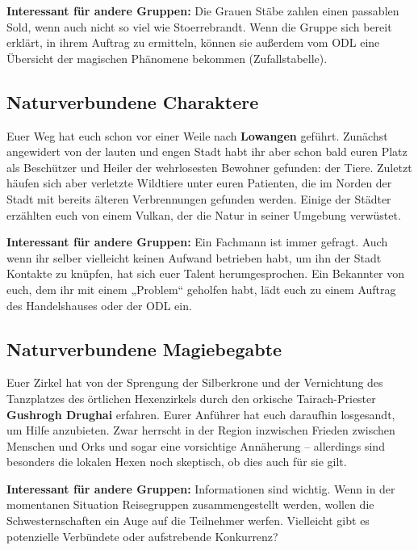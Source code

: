 \textbf{Interessant für andere Gruppen:} Die Grauen Stäbe zahlen einen
passablen Sold, wenn auch nicht so viel wie Stoerrebrandt. Wenn
die Gruppe sich bereit erklärt, in ihrem Auftrag zu ermitteln,
können sie außerdem vom ODL eine Übersicht der magischen
Phänomene bekommen (Zufallstabelle).

\subsection*{Naturverbundene Charaktere}
Euer Weg hat euch schon vor einer Weile nach \textbf{Lowangen} geführt.
Zunächst angewidert von der lauten und engen Stadt habt ihr aber schon bald euren Platz als Beschützer und Heiler der wehrlosesten Bewohner gefunden: der Tiere.
Zuletzt häufen sich aber verletzte Wildtiere unter euren Patienten, die im Norden der Stadt mit bereits älteren Verbrennungen gefunden werden.
Einige der Städter erzählten euch von einem Vulkan, der die Natur in seiner Umgebung verwüstet.

\neueseite

\textbf{Interessant für andere Gruppen:} Ein Fachmann ist immer gefragt.
Auch wenn ihr selber vielleicht keinen Aufwand betrieben habt,
um ihn der Stadt Kontakte zu knüpfen, hat sich euer Talent
herumgesprochen. Ein Bekannter von euch, dem ihr mit einem
„Problem“ geholfen habt, lädt euch zu einem Auftrag des
Handelshauses oder der ODL ein.
\subsection*{Naturverbundene Magiebegabte}
Euer Zirkel hat von der Sprengung der Silberkrone und der Vernichtung des Tanzplatzes des örtlichen Hexenzirkels durch den orkische Tairach-Priester \textbf{Gushrogh Drughai} erfahren.
Eurer Anführer hat euch daraufhin losgesandt, um Hilfe anzubieten.
Zwar herrscht in der Region inzwischen Frieden zwischen Menschen und Orks und sogar eine vorsichtige Annäherung --
allerdings sind besonders die lokalen Hexen noch skeptisch, ob dies auch für sie gilt.

\textbf{Interessant für andere Gruppen:} Informationen sind wichtig. Wenn
in der momentanen Situation Reisegruppen zusammengestellt
werden, wollen die Schwesternschaften ein Auge auf die
Teilnehmer werfen. Vielleicht gibt es potenzielle Verbündete
oder aufstrebende Konkurrenz?


